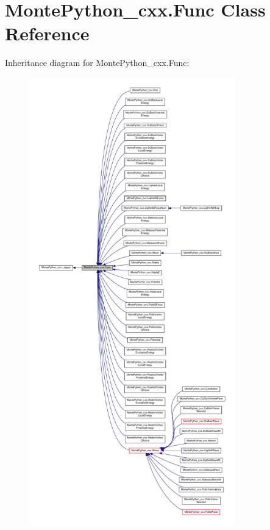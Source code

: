 \hypertarget{classMontePython__cxx_1_1Func}{}\section{Monte\+Python\+\_\+cxx.\+Func Class Reference}
\label{classMontePython__cxx_1_1Func}


Inheritance diagram for Monte\+Python\+\_\+cxx.\+Func\+:
\nopagebreak
\begin{figure}[H]
\begin{center}
\leavevmode
\includegraphics[height=550pt]{classMontePython__cxx_1_1Func__inherit__graph}
\end{center}
\end{figure}



